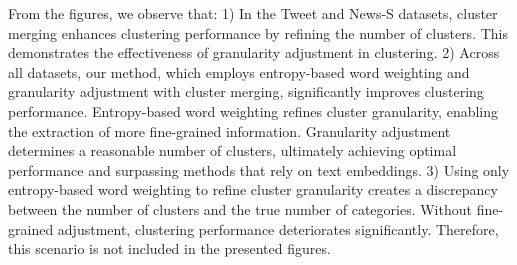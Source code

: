 From the figures, we observe that: 1) In the Tweet and News-S datasets, cluster merging enhances clustering performance by refining the number of clusters. This demonstrates the effectiveness of granularity adjustment in clustering. 2) Across all datasets, our method, which employs entropy-based word weighting and granularity adjustment with cluster merging, significantly improves clustering performance. Entropy-based word weighting refines cluster granularity, enabling the extraction of more fine-grained information. Granularity adjustment determines a reasonable number of clusters, ultimately achieving optimal performance and surpassing methods that rely on text embeddings. 3) Using only entropy-based word weighting to refine cluster granularity creates a discrepancy between the number of clusters and the true number of categories. Without fine-grained adjustment, clustering performance deteriorates significantly. Therefore, this scenario is not included in the presented figures.


